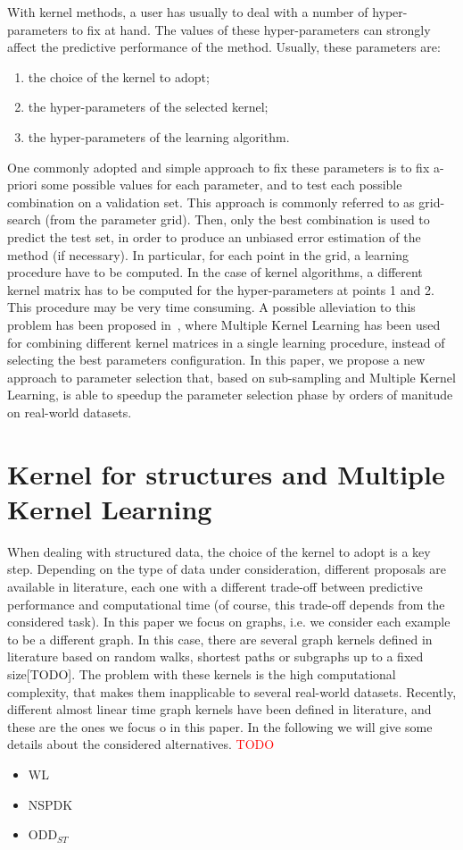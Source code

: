 \documentclass{esannV2}
\begin{document}
With kernel methods, a user has usually to deal with a number of hyper-parameters to fix at hand. The values of these hyper-parameters can strongly affect the predictive performance of the method.
Usually, these parameters are:
\begin{enumerate}
 \item the choice of the kernel to adopt;
 \item the hyper-parameters of the selected kernel;
 \item the hyper-parameters of the learning algorithm.
\end{enumerate}
One commonly adopted and simple approach to fix these parameters is to fix a-priori some possible values for each parameter, and to test each possible combination on a validation set. This approach is commonly referred to as grid-search (from the parameter grid).
Then, only the best combination is used to predict the test set, in order to produce an unbiased error estimation of the method (if necessary).
In particular, for each point in the grid, a learning procedure have to be computed. In the case of kernel algorithms, a different kernel matrix has to be computed for the hyper-parameters at points 1 and 2.
This procedure may be very time consuming.
A possible alleviation to this problem has been proposed in~\cite{Massimo2016}, where Multiple Kernel Learning has been used for combining different kernel matrices in a single learning procedure, instead of selecting the best parameters configuration.
In this paper, we propose a new approach to parameter selection that, based on sub-sampling and Multiple Kernel Learning, is able to speedup the parameter selection phase by orders of manitude on real-world datasets.
\section{Kernel for structures and Multiple Kernel Learning}
When dealing with structured data, the choice of the kernel to adopt is a key step. Depending on the type of data under consideration, different proposals are available in literature, each one with a different trade-off between predictive performance and computational time (of course, this trade-off depends from the considered task).
In this paper we focus on graphs, i.e. we consider each example to be a different graph.
In this case, there are several graph kernels defined in literature based on random walks, shortest paths or subgraphs up to a fixed size[TODO]. The problem with these kernels is the high computational complexity, that makes them inapplicable to several real-world datasets.
Recently, different almost linear time graph kernels have been defined in literature, and these are the ones we focus o in this paper.
In the following we will give some details about the considered alternatives.
\textcolor{red}{TODO}\\
\begin{itemize}
 \item WL
 \item NSPDK
 \item ODD$_{ST}$
\end{itemize}
\end{document}
